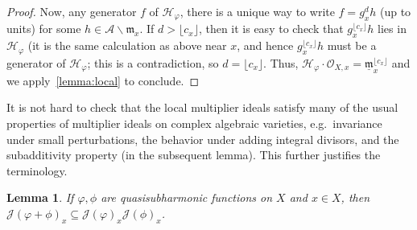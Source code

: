 \documentclass[10pt,reqno]{amsart}
\theoremstyle{plain}
\newtheorem{lemma}[theorem]{Lemma}
\theoremstyle{definition}
\newcommand{\frakm}{\mathfrak{m}}
\renewcommand{\H}{\mathcal{H}}
\numberwithin{equation}{section}
\renewcommand{\O}{\mathcal{O}}
\newcommand{\J}{\mathcal{J}}
\begin{document}
\begin{proof}
Now, any generator $f$ of $\H_{\varphi}$, there is a unique way to write $f = g_x^d h$ (up to units) for some $h \in \mathcal{A} \backslash \frakm_x$. If $d > \lfloor c_x \rfloor$, then it is easy to check that $g_x^{\lfloor c_x \rfloor} h$ lies in $\H_{\varphi}$ (it is the same calculation as above near $x$, and hence $g_x^{\lfloor c_x \rfloor} h$ must be a generator of $\H_{\varphi}$; this is a contradiction, so $d = \lfloor c_x \rfloor$. 
Thus, $\H_{\varphi} \cdot \O_{X,x} = \underline{\frakm}_x^{\lfloor c_x \rfloor}$ and we apply~\cref{lemma:local} to conclude.
\end{proof}

It is not hard to check that the local multiplier ideals satisfy many of the usual properties of multiplier ideals on complex algebraic varieties, e.g.\ invariance under small perturbations, the behavior under adding integral divisors, and the subadditivity property (in the subsequent lemma). This further justifies the terminology.

\begin{comment}
\begin{lemma}
Let $\varphi, \phi$ be quasisubharmonic functions on $X$ and $x \in X$. Then, ****indent the list???****
\begin{enumerate}[(a)]
\item $\J(\varphi + \phi)_x \subseteq \J(\varphi)_x \J(\phi)_x$;
\item $\H_{\varphi + \phi} \subseteq \H_{\varphi} \H_{\phi}$.
\end{enumerate}
\end{lemma}

\begin{proof}
The assertion (a) follows from the observation that $\lfloor \Delta (\varphi + \phi)\{ x \} \rfloor \geq \lfloor \Delta \varphi \{ x \} \rfloor + \lfloor \Delta \phi \{ x \} \rfloor$. For (b), the inclusion holds iff $\H_{\varphi + \phi} \widehat{\mathcal{A}}_{\frakm_x} \subseteq \left( \H_{\varphi} \H_{\phi} \right) \widehat{\mathcal{A}}_{\frakm_x}$ for all maximal ideals $\frakm_x$ of $\mathcal{A}$. The claim then follows from~\cref{lemma:coherence} and (a).
\end{proof}
\end{comment}

\begin{lemma}\label{lemma:local_subadditivity}
If $\varphi,\phi$ are quasisubharmonic functions on $X$ and $x \in X$, then $\J(\varphi + \phi)_x \subseteq \J(\varphi)_x \J(\phi)_x$.
\end{lemma}
\end{document}
